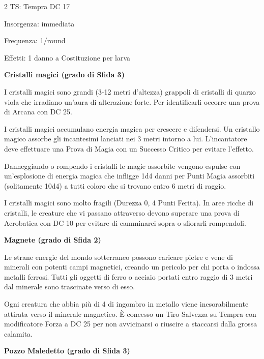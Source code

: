\begin{multicols}{2}
TS: Tempra DC 17

Insorgenza: immediata

Frequenza: 1/round

Effetti: 1 danno a Costituzione per larva

\medskip
\textbf{Cristalli magici (grado di Sfida 3)}

I cristalli magici sono grandi (3-12 metri d'altezza) grappoli di cristalli di quarzo viola che irradiano un'aura di alterazione forte. Per identificarli occorre una prova di Arcana con DC 25.

I cristalli magici accumulano energia magica per crescere e difendersi. Un cristallo magico assorbe gli incantesimi lanciati nei 3 metri intorno a lui. L'incantatore deve effettuare una Prova di Magia con un Successo Critico per evitare l'effetto.

Danneggiando o rompendo i cristalli le magie assorbite vengono espulse con un'esplosione di energia magica che infligge 1d4 danni per Punti Magia assorbiti (solitamente 10d4) a tutti coloro che si trovano entro 6 metri di raggio.

I cristalli magici sono molto fragili (Durezza 0, 4 Punti Ferita).
In aree ricche di cristalli, le creature che vi passano attraverso devono superare una prova di Acrobatica con DC 10 per evitare di camminarci sopra o sfiorarli rompendoli.

\medskip
\textbf{Magnete (grado di Sfida 2)}

Le strane energie del mondo sotterraneo possono caricare pietre e vene di minerali con potenti campi magnetici, creando un pericolo per chi porta o indossa metalli ferrosi. Tutti gli oggetti di ferro o acciaio portati entro raggio di 3 metri dal minerale sono trascinate verso di esso.




Ogni creatura che abbia più di 4 di ingombro in metallo viene inesorabilmente attirata verso il minerale magnetico. È concesso un Tiro Salvezza su Tempra con modificatore Forza a DC 25 per non avvicinarsi o riuscire a staccarsi dalla grossa calamita.

\medskip
\textbf{Pozzo Maledetto (grado di Sfida 3)}


\end{multicols}
